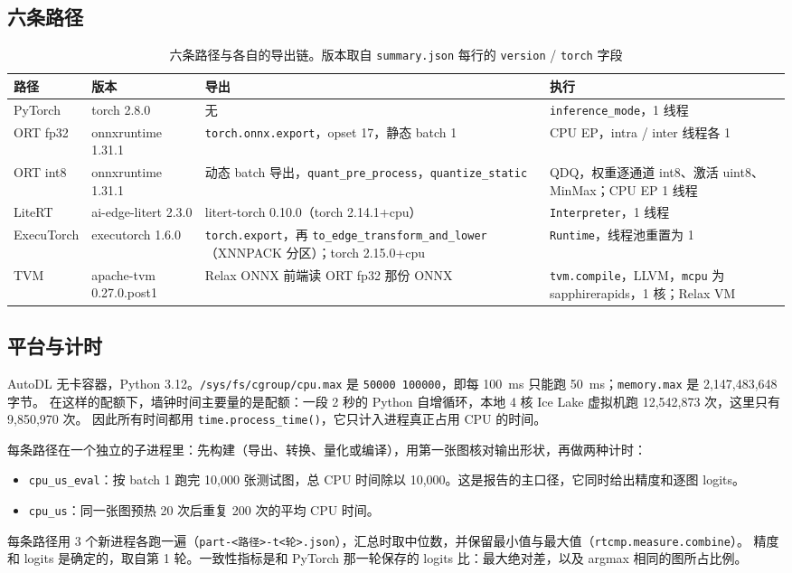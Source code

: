 \documentclass[11pt,a4paper]{ctexart}
\begin{document}
\subsection{六条路径}
\begin{table}[H]
\centering\small
\caption{六条路径与各自的导出链。版本取自 \texttt{summary.json} 每行的 \texttt{version} / \texttt{torch} 字段}\label{tab:paths}
\begin{tabularx}{\linewidth}{>{\raggedright\arraybackslash}p{1.8cm}>{\raggedright\arraybackslash}p{2.6cm}>{\raggedright\arraybackslash}X>{\raggedright\arraybackslash}X}
\toprule
路径 & 版本 & 导出 & 执行 \\
\midrule
PyTorch & torch 2.8.0 & 无 & \texttt{inference\_mode}，1 线程 \\
ORT fp32 & onnxruntime 1.31.1 & \texttt{torch.onnx.export}，opset 17，静态 batch 1 & CPU EP，intra / inter 线程各 1 \\
ORT int8 & onnxruntime 1.31.1 & 动态 batch 导出，\texttt{quant\_pre\_process}，\texttt{quantize\_static} & QDQ，权重逐通道 int8、激活 uint8、MinMax；CPU EP 1 线程 \\
LiteRT & ai-edge-litert 2.3.0 & litert-torch 0.10.0（torch 2.14.1+cpu） & \texttt{Interpreter}，1 线程 \\
ExecuTorch & executorch 1.6.0 & \texttt{torch.export}，再 \texttt{to\_edge\_\allowbreak transform\_\allowbreak and\_lower}（XNNPACK 分区）；torch 2.15.0+cpu & \texttt{Runtime}，线程池重置为 1 \\
TVM & apache-tvm 0.27.0.post1 & Relax ONNX 前端读 ORT fp32 那份 ONNX & \texttt{tvm.compile}，LLVM，\texttt{mcpu} 为 sapphirerapids，1 核；Relax VM \\
\bottomrule
\end{tabularx}
\end{table}

\subsection{平台与计时}
AutoDL 无卡容器，Python 3.12。\texttt{/sys/fs/cgroup/cpu.max} 是 \texttt{50000 100000}，即每 100~ms 只能跑 50~ms；\texttt{memory.max} 是 2,147,483,648 字节。
在这样的配额下，墙钟时间主要量的是配额：一段 2 秒的 Python 自增循环，本地 4 核 Ice Lake 虚拟机跑 12,542,873 次，这里只有 9,850,970 次。
因此所有时间都用 \texttt{time.process\_time()}，它只计入进程真正占用 CPU 的时间。

每条路径在一个独立的子进程里：先构建（导出、转换、量化或编译），用第一张图核对输出形状，再做两种计时：
\begin{itemize}
  \item \texttt{cpu\_us\_eval}：按 batch 1 跑完 10,000 张测试图，总 CPU 时间除以 10,000。这是报告的主口径，它同时给出精度和逐图 logits。
  \item \texttt{cpu\_us}：同一张图预热 20 次后重复 200 次的平均 CPU 时间。
\end{itemize}
每条路径用 3 个新进程各跑一遍（\texttt{part-<路径>-t<轮>.json}），汇总时取中位数，并保留最小值与最大值（\texttt{rtcmp.measure.combine}）。
精度和 logits 是确定的，取自第 1 轮。一致性指标是和 PyTorch 那一轮保存的 logits 比：最大绝对差，以及 argmax 相同的图所占比例。
\end{document}
